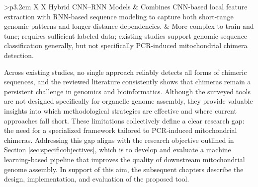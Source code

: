 \begin{landscape}
\begin{xltabular}{\linewidth}{>{\bfseries}p{3.2cm} X X}
    Hybrid CNN--RNN Models &
    Combines CNN-based local feature extraction with RNN-based sequence modeling to capture both short-range genomic patterns and longer-distance dependencies. &
    More complex to train and tune; requires sufficient labeled data; existing studies support genomic sequence classification generally, but not specifically PCR-induced mitochondrial chimera detection. \\

\end{xltabular}

\end{landscape}
\restoregeometry


Across existing studies, no single approach reliably detects all forms of chimeric sequences, and the reviewed literature consistently shows that chimeras remain a persistent challenge in genomics and bioinformatics. Although the surveyed tools are not designed specifically for organelle genome assembly, they provide valuable insights into which methodological strategies are effective and where current approaches fall short. These limitations collectively define a clear research gap: the need for a specialized framework tailored to PCR-induced mitochondrial chimeras. Addressing this gap aligns with the research objective outlined in Section \ref{sec:specificobjectives}, which is to develop and evaluate a machine learning-based pipeline that improves the quality of downstream mitochondrial genome assembly. In support of this aim, the subsequent chapters describe the design, implementation, and evaluation of the proposed tool.
